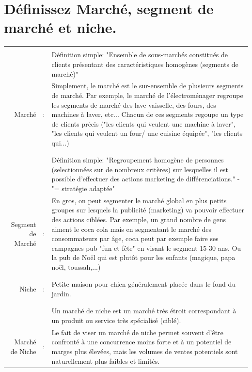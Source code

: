 \documentclass{article}
\begin{document}
\section{Définissez Marché, segment de marché et niche.}
\begin{tabular}{|rcl|}
\hline
&&\\
&& \multicolumn{1}{p{.8\textwidth}|}{Définition simple: "Ensemble de sous-marchés constitués de clients présentant des caractéristiques homogènes (segments de marché)"}\\
Marché & : & \multicolumn{1}{p{.8\textwidth}|}{Simplement, le marché est le sur-ensemble de plusieurs segments de marché. Par exemple, le marché de l'électroménager regroupe les segments de marché des lave-vaisselle, des fours, des machines à laver, etc... Chacun de ces segments regoupe un type de clients précis ("les clients qui veulent une machine à laver", "les clients qui veulent un four/ une cuisine équipée", "les clients qui...)}\\
&&\\
\hline
&&\\
&& \multicolumn{1}{p{.8\textwidth}|}{Définition simple: "Regroupement homogène de personnes (selectionnées sur de nombreux critères) sur lesquelles il est possible d'effectuer des actions marketing de différenciations." - "= stratégie adaptée"}\\
Segment de Marché & : & \multicolumn{1}{p{.8\textwidth}|}{En gros, on peut segmenter le marché global en plus petits groupes sur lesquels la publicité (marketing) va pouvoir effectuer des actions ciblées. Par exemple, un grand nombre de gens aiment le coca cola mais en segmentant le marché des consommateurs par âge, coca peut par exemple faire ses campagnes pub "fun et fête" en visant le segment 15-30 ans. Ou la pub de Noël qui est plutôt pour les enfants (magique, papa noël, toussah,...)}\\
&&\\
\hline
&&\\
Niche & : & \multicolumn{1}{p{.8\textwidth}|}{Petite maison pour chien généralement placée dans le fond du jardin.}\\
&&\\
\hline
&&\\
				 &   & \multicolumn{1}{p{.8\textwidth}|}{Un marché de niche est un marché très étroit correspondant à un produit ou service très spécialisé (ciblé).}\\
Marché de Niche & : & \multicolumn{1}{p{.8\textwidth}|}{Le fait de viser un marché de niche permet souvent d’être confronté à une concurrence moins forte et à un potentiel de marges plus élevées, mais les volumes de ventes potentiels sont naturellement plus faibles et limités.}\\

\end{tabular}
\end{document}
